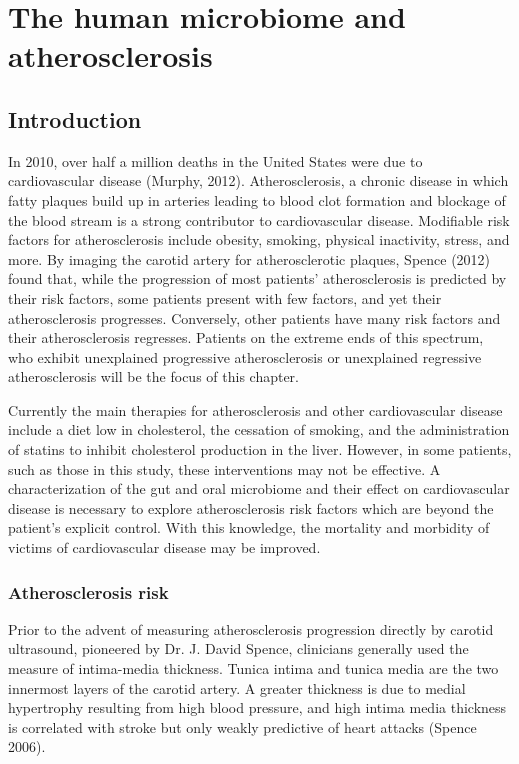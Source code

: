 \chapter{The human microbiome and atherosclerosis}
\section{Introduction}
In 2010, over half a million deaths in the United States were due to cardiovascular disease (Murphy, 2012). Atherosclerosis, a chronic disease in which fatty plaques build up in arteries leading to blood clot formation and blockage of the blood stream is a strong contributor to cardiovascular disease. Modifiable risk factors for atherosclerosis include obesity, smoking, physical inactivity, stress, and more. By imaging the carotid artery for atherosclerotic plaques, Spence (2012) found that, while the progression of most patients’ atherosclerosis is predicted by their risk factors, some patients present with few factors, and yet their atherosclerosis progresses. Conversely, other patients have many risk factors and their atherosclerosis regresses. Patients on the extreme ends of this spectrum, who exhibit unexplained progressive atherosclerosis or unexplained regressive atherosclerosis will be the focus of this chapter.

Currently the main therapies for atherosclerosis and other cardiovascular disease include a diet low in cholesterol, the cessation of smoking, and the administration of statins to inhibit cholesterol production in the liver. However, in some patients, such as those in this study, these interventions may not be effective. A characterization of the gut and oral microbiome and their effect on cardiovascular disease is necessary to explore atherosclerosis risk factors which are beyond the patient’s explicit control. With this knowledge, the mortality and morbidity of victims of cardiovascular disease may be improved.

\subsection{Atherosclerosis risk}
Prior to the advent of measuring atherosclerosis progression directly by carotid ultrasound, pioneered by Dr. J. David Spence, clinicians generally used the measure of intima-media thickness. Tunica intima and tunica media are the two innermost layers of the carotid artery. A greater thickness is due to medial hypertrophy resulting from high blood pressure, and high intima media thickness is correlated with stroke but only weakly predictive of heart attacks (Spence 2006).


